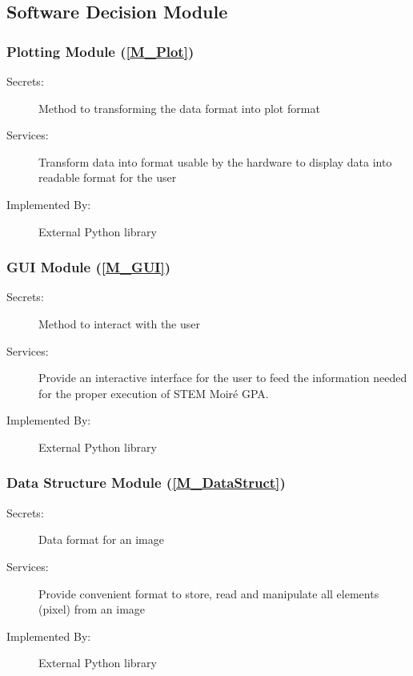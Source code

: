 \documentclass[12pt, titlepage]{article}
\newcommand{\progname}{STEM Moir{\'e} GPA}
\begin{document}
\subsection{Software Decision Module}

\subsubsection{Plotting Module (\cref{M_Plot})}

\begin{description}
\item[Secrets:] Method to transforming the data format into plot format
\item[Services:] Transform data into format usable by the hardware to display data into readable format for the user
 
\item[Implemented By:] External Python library
\end{description}

\subsubsection{GUI Module (\cref{M_GUI})}

\begin{description}
\item[Secrets:] Method to interact with the user
\item[Services:] Provide an interactive interface for the user to feed the information needed for the proper execution of \progname{}. 
 
\item[Implemented By:] External Python library
\end{description}

\subsubsection{Data Structure Module (\cref{M_DataStruct})}

\begin{description}
\item[Secrets:] Data format for an image
\item[Services:] Provide convenient format to store, read and manipulate all elements (pixel) from an image
 
\item[Implemented By:] External Python library
\end{description}
\end{document}
